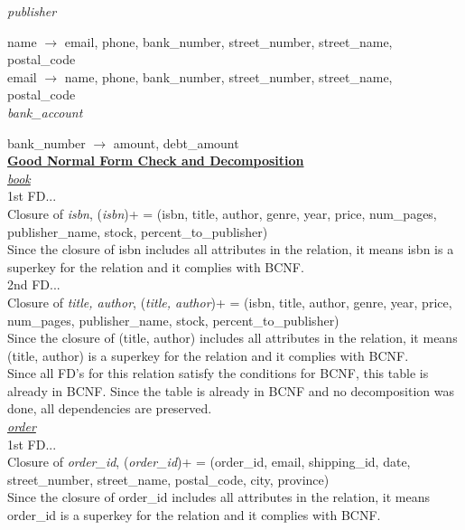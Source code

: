 \documentclass[a4 paper]{article}
\begin{document}
\noindent\emph{publisher}

name $\rightarrow$ email, phone, bank\_number, street\_number, street\_name, postal\_code\\
\indent email $\rightarrow$ name, phone, bank\_number, street\_number, street\_name, postal\_code\\

\noindent\emph{bank\_account}

bank\_number $\rightarrow$ amount, debt\_amount\\

\noindent\underline{\textbf{Good Normal Form Check and Decomposition}}\\

\noindent\underline{\emph{book}}\\

\noindent 1st FD...\\
\indent Closure of \emph{isbn}, (\emph{isbn})+ = (isbn, title, author, genre, year, price, num\_pages, publisher\_name, stock, percent\_to\_publisher)\\
\indent Since the closure of isbn includes all attributes in the relation, it means isbn is a superkey for the relation and it complies with BCNF.\\

\noindent 2nd FD...\\
\indent Closure of \emph{title, author}, (\emph{title, author})+ = (isbn, title, author, genre, year, price, num\_pages, publisher\_name, stock, percent\_to\_publisher)\\
\indent Since the closure of (title, author) includes all attributes in the relation, it means (title, author) is a superkey for the relation and it complies with BCNF.\\

\noindent Since all FD's for this relation satisfy the conditions for BCNF, this table is already in BCNF. Since the table is already in BCNF and no decomposition was done, all dependencies are preserved.\\

\noindent\underline{\emph{order}}\\

\noindent 1st FD...\\
\indent Closure of \emph{order\_id}, (\emph{order\_id})+ = (order\_id, email, shipping\_id, date, street\_number, street\_name, postal\_code, city, province)\\
\indent Since the closure of order\_id includes all attributes in the relation, it means order\_id is a superkey for the relation and it complies with BCNF.\\
\end{document}
